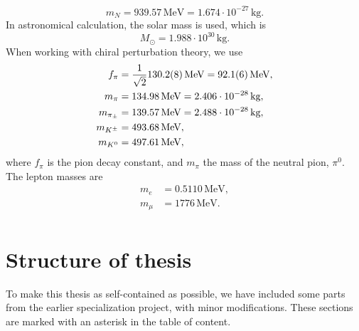 %
\begin{equation}
    \label{mass of neutron}
    m_N = 939.57 \, \text{MeV} = 1.674\cdot 10^{-27} \, \text{kg}.
\end{equation}
%
In astronomical calculation, the solar mass is used, which is
%
\begin{equation}
    \label{solar mass}
    M_\odot = 1.988 \cdot 10^{30} \, \text{kg}.
\end{equation}
%
When working with chiral perturbation theory, we use
%
\begin{align}
    \label{pion decay constant}
    f_\pi & = \frac{1}{\sqrt{2}}130.2 (8) \, \text{MeV} = 92.1(6) \, \text{MeV}, \\
    \label{pion mass}
    m_\pi & = 134.98 \, \text{MeV} = 2.406 \cdot 10^{-28} \, \text{kg}, \\
    \label{charged pion mass}
    m_{\pi_\pm} &= 139.57 \, \text{MeV} = 2.488 \cdot 10^{-28}\, \text{kg}, \\
    m_{{K^\pm}} & = 493.68\,\text{MeV}, \\
    m_{{K^0}} & = 497.61\,\text{MeV},
\end{align}
%
where $f_\pi$ is the pion decay constant, and $m_\pi$ the mass of the neutral pion, $\pi^0$.
The lepton masses are
%
\begin{align}
    m_e &= 0.5110 \, \text{MeV}, \\
    m_\mu &= 1776 \, \text{MeV}. \\
\end{align}

\section{Structure of thesis}

To make this thesis as self-contained as possible, we have included some parts from the earlier specialization project, with minor modifications.
These sections are marked with an asterisk in the table of content.
